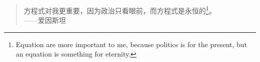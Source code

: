 \begin{frame}[plain]
    \centering
    \begin{quote}
        \Large 方程式对我更重要，因为政治只看眼前，而方程式是永恒的\footnote{Equation are more important to me, because politics is for the present, but an equation is something for eternity.}。\\
        \raggedleft
        ——爱因斯坦
    \end{quote}
\end{frame}
